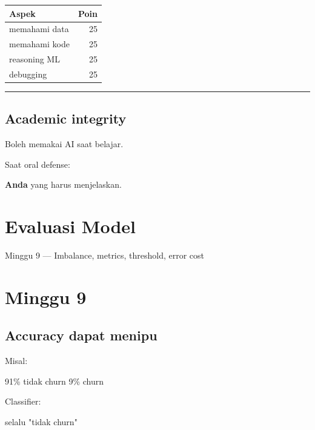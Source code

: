 \documentclass[
  indonesian,
  letterpaper,
  DIV=11,
  numbers=noendperiod]{scrreprt}
\newenvironment{Shaded}{\begin{snugshade}}{\end{snugshade}}
\newcommand{\NormalTok}[1]{\textcolor[rgb]{0.00,0.23,0.31}{#1}}
\newcounter{none} %
\begin{document}
{\def\LTcaptype{none} %
\begin{longtable}[]{@{}lr@{}}
\toprule\noalign{}
Aspek & Poin \\
\midrule\noalign{}
\endhead
\bottomrule\noalign{}
\endlastfoot
memahami data & 25 \\
memahami kode & 25 \\
reasoning ML & 25 \\
debugging & 25 \\
\end{longtable}
}

\begin{center}\rule{0.5\linewidth}{0.5pt}\end{center}

\section{Academic integrity}\label{academic-integrity}

Boleh memakai AI saat belajar.

Saat oral defense:

\textbf{Anda} yang harus menjelaskan.

\chapter{Evaluasi Model}\label{evaluasi-model}

Minggu 9 --- Imbalance, metrics, threshold, error cost

\hfill\break

\chapter{Minggu 9}\label{minggu-9}

\section{Accuracy dapat menipu}\label{accuracy-dapat-menipu}

Misal:

\begin{Shaded}
\begin{Highlighting}[]
\NormalTok{91\% tidak churn}
\NormalTok{9\% churn}
\end{Highlighting}
\end{Shaded}

Classifier:

\begin{Shaded}
\begin{Highlighting}[]
\NormalTok{selalu "tidak churn"}
\end{Highlighting}
\end{Shaded}
\end{document}
